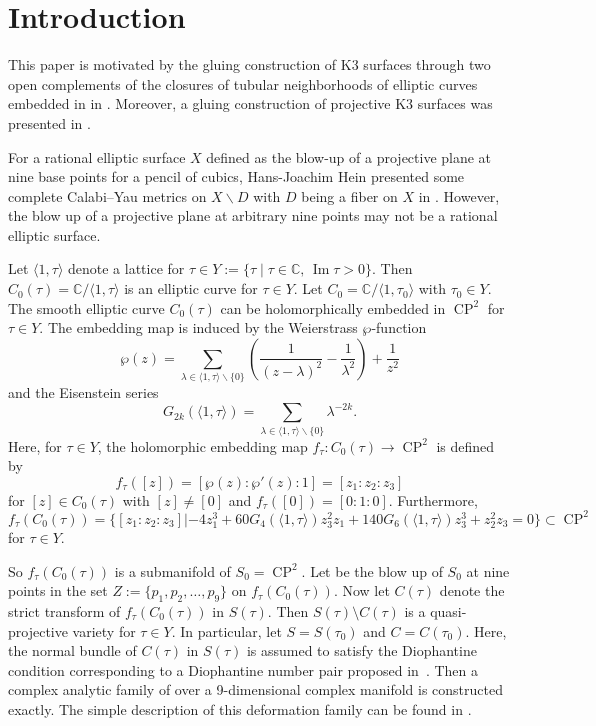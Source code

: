 \documentclass[pdftex]{sigma}
\numberwithin{equation}{section}
\begin{document}

\section{Introduction}

This paper is motivated by the gluing construction of K3 surfaces through two open complements of the closures of tubular neighborhoods of elliptic curves embedded in  in \cite{Takayuki-Takato1}. Moreover, a gluing construction of projective K3 surfaces was presented in \cite{Takayuki-Takato2}.

For a rational elliptic surface $ X $ defined as the blow-up of a projective plane at nine base points for a pencil of cubics, Hans-Joachim Hein presented some complete Calabi--Yau metrics on $ X \backslash D $ with $D$ being a fiber on $X$ in \cite{Hans}. However, the blow up of a projective plane at arbitrary nine points may not be a rational elliptic surface.

Let $ \langle 1,\tau \rangle$ denote a lattice for $\tau\in Y:=\{\tau \mid \tau\in \mathbb{C},\, \operatorname{\operatorname{Im}}\tau>0 \}$. Then $C_0(\tau)=\mathbb{C}/ \langle 1,\tau \rangle$ is an elliptic curve for $\tau\in Y$. Let $C_0=\mathbb{C}/ \langle 1,\tau_0 \rangle$ with $\tau_0 \in Y$. The smooth elliptic curve $C_0 (\tau)$ can be holomorphically embedded in $\operatorname{CP}^2$ for $\tau \in Y$. The embedding map is induced by the Weierstrass $\wp$-function
\[\wp(z) =\sum _{\lambda \in \langle 1,\tau \rangle \backslash \{0\}} \left(\frac{1}{(z-\lambda )^2}-\frac{1}{\lambda ^2}\right)+\frac{1}{z^2}\]
and the Eisenstein series
\[G_{2k} ( \langle 1,\tau \rangle)=\sum _{\lambda \in \langle 1,\tau \rangle \backslash \{0\}} \lambda ^{-2k}.\]
Here, for $\tau\in Y$, the holomorphic embedding map $f_\tau\colon C_0 (\tau) \rightarrow\operatorname{CP}^2$ is defined by
\[f_\tau([z])=[\wp(z):\wp'(z):1]=[z_1:z_2:z_3]\]
for $[z]\in C_0 (\tau)$ with $[z]\neq[0]$ and $f_\tau([0])=[0:1:0]$. Furthermore,
\[f_\tau(C_0(\tau))=\bigl\{ [z_1:z_2:z_3]|-4 z_1^3+60 G_4 ( \langle 1,\tau \rangle)z_3^2 z_1+140 G_6 ( \langle 1,\tau \rangle)z_3^3+z_2^2 z_3=0\bigr\}\subset\operatorname{CP}^2\]
for $\tau \in Y$.

So $f_\tau(C_0(\tau))$ is a submanifold of $S_0=\operatorname{CP}^2$. Let  be the blow up of $S_0$ at nine points in the set $Z:=\{p_1,p_2,\dots ,p_9\}$ on $f_\tau(C_0(\tau))$. Now let $C(\tau)$ denote the strict transform of $f_\tau(C_0(\tau))$ in $S(\tau)$. Then $S(\tau)\setminus C(\tau)$ is a quasi-projective variety for $\tau\in Y$. In particular, let $S=S(\tau_0)$ and $C=C(\tau_0)$. Here, the normal bundle of $C(\tau)$ in $S(\tau)$ is assumed to satisfy the Diophantine condition corresponding to a Diophantine number pair proposed in~\cite{Takayuki-Takato2}. Then a complex analytic family of  over a 9-dimensional complex manifold is constructed exactly. The simple description of this deformation family can be found in \cite{Takayuki-Takato1}.
\end{document}
